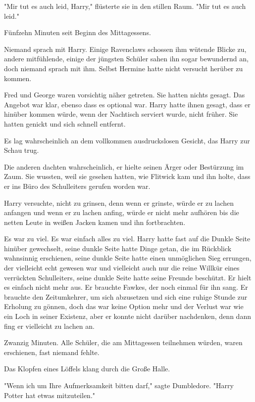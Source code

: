 {"Mir tut es auch leid, Harry," flüsterte sie in den stillen Raum. "Mir tut es auch leid."

\later

Fünfzehn Minuten seit Beginn des Mittagessens.

Niemand sprach mit Harry. Einige Ravenclaws schossen ihm wütende Blicke zu, andere mitfühlende, einige der jüngsten Schüler sahen ihn sogar bewundernd an, doch niemand sprach mit ihm. Selbst Hermine hatte nicht versucht herüber zu kommen.

Fred und George waren vorsichtig näher getreten. Sie hatten nichts gesagt. Das Angebot war klar, ebenso dass es optional war. Harry hatte ihnen gesagt, dass er hinüber kommen würde, wenn der Nachtisch serviert wurde, nicht früher. Sie hatten genickt und sich schnell entfernt.

Es lag wahrscheinlich an dem vollkommen ausdruckslosen Gesicht, das Harry zur Schau trug.

Die anderen dachten wahrscheinlich, er hielte seinen Ärger oder Bestürzung im Zaum. Sie wussten, weil sie gesehen hatten, wie Flitwick kam und ihn holte, dass er ins Büro des Schulleiters gerufen worden war.

Harry versuchte, nicht zu grinsen, denn wenn er grinste, würde er zu lachen anfangen und wenn er zu lachen anfing, würde er nicht mehr aufhören bis die netten Leute in weißen Jacken kamen und ihn fortbrachten.

Es war zu viel. Es war einfach alles zu viel. Harry hatte fast auf die Dunkle Seite hinüber gewechselt, seine dunkle Seite hatte Dinge getan, die im Rückblick wahnsinnig erschienen, seine dunkle Seite hatte einen unmöglichen Sieg errungen, der vielleicht echt gewesen war und vielleicht auch nur die reine Willkür eines verrückten Schulleiters, seine dunkle Seite hatte seine Freunde beschützt. Er hielt es einfach nicht mehr aus. Er brauchte Fawkes, der noch einmal für ihn sang. Er brauchte den Zeitumkehrer, um sich abzusetzen und sich eine ruhige Stunde zur Erholung zu gönnen, doch das war keine Option mehr und der Verlust war wie ein Loch in seiner Existenz, aber er konnte nicht darüber nachdenken, denn dann fing er vielleicht zu lachen an.

Zwanzig Minuten. Alle Schüler, die am Mittagessen teilnehmen würden, waren erschienen, fast niemand fehlte.

Das Klopfen eines Löffels klang durch die Große Halle.

"Wenn ich um Ihre Aufmerksamkeit bitten darf," sagte Dumbledore. "Harry Potter hat etwas mitzuteilen."

}
